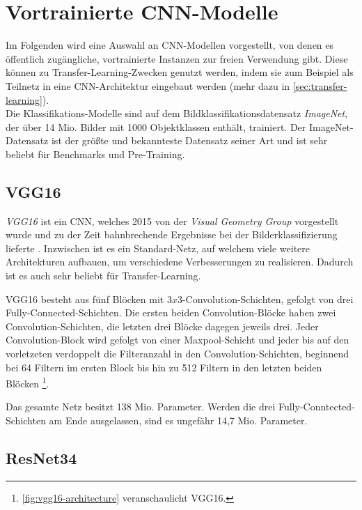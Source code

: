 \section{Vortrainierte \ac{CNN}-Modelle} \label{sec:pretrained-backbones}

Im Folgenden wird eine Auswahl an \ac{CNN}-Modellen vorgestellt, von denen es öffentlich zugängliche,
vortrainierte Instanzen zur freien Verwendung gibt. Diese können zu Transfer-Learning-Zwecken 
genutzt werden, indem sie zum Beispiel als Teilnetz in eine \ac{CNN}-Architektur eingebaut werden 
(mehr dazu in \autoref{sec:transfer-learning}). \\ 
Die Klassifikations-Modelle sind auf dem Bildklassifikationsdatensatz \textit{ImageNet}, der über 14 Mio. Bilder 
mit 1000 Objektklassen enthält, trainiert. Der ImageNet-Datensatz ist der größte und bekannteste 
Datensatz seiner Art und ist sehr beliebt für Benchmarks und Pre-Training.

\subsection{VGG16} \label{sec:pretrained-backbones:vgg16}

\textit{VGG16} ist ein \ac{CNN}, welches 2015 von der \textit{Visual Geometry Group} vorgestellt wurde 
und zu der Zeit bahnbrechende Ergebnisse bei der Bilderklassifizierung lieferte \cite{Simonyan.04092014}. 
Inzwischen ist es ein Standard-Netz, auf welchem viele weitere Architekturen aufbauen,
um verschiedene Verbesserungen zu realisieren. 
Dadurch ist es auch sehr beliebt für Transfer-Learning. 

VGG16 besteht aus fünf Blöcken mit $3x3$-Convolution-Schichten,
gefolgt von drei Fully-Connected-Schichten. Die ersten beiden Convolution-Blöcke haben zwei Convolution-Schichten,
die letzten drei Blöcke dagegen jeweils drei. 
Jeder Convolution-Block wird gefolgt von einer Maxpool-Schicht und jeder bis auf den vorletzeten verdoppelt die Filteranzahl in den Convolution-Schichten,
beginnend bei 64 Filtern im ersten Block bis hin zu 512 Filtern in den letzten beiden Blöcken \cite{Simonyan.04092014}\footnote{\autoref{fig:vgg16-architecture} veranschaulicht VGG16.}. 

Das gesamte Netz besitzt 138 Mio. Parameter. Werden die drei Fully-Conntected-Schichten am Ende ausgelassen, 
sind es ungefähr 14,7 Mio. Parameter. 

\subsection{ResNet34} \label{sec:pretrained-backbones:resnet}

